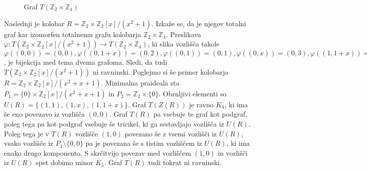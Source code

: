 \documentclass[a4paper, 12pt]{amsart}
\theoremstyle{definition} %
\theoremstyle{plain} %
\newcommand{\Z}{\mathbb Z}
\begin{document}
\begin{enumerate}
\begin{figure}[h!]
\centering

\caption{Graf $T(\Z_2\times \Z_4)$}
\label{T(Z2xZ4)}
\end{figure}

Naslednji je kolobar $R=\Z_2 \times \Z_2[x]/(x^2 + 1)$. Izkaže se, da je njegov totalni graf kar izomorfen totalnemu grafu kolobarja $\Z_2 \times \Z_4$. Preslikava $\varphi : T(\Z_2 \times \Z_2[x]/(x^2 + 1)) \rightarrow T(\Z_2 \times \Z_4)$, ki slika vozlišča takole $\varphi((0,0))=(0,0),\varphi((0,1+x))=(0,2),\varphi((0,1))=(0,1),\varphi((0,x))=(0,3),\varphi((1,1+x))=(1,2),\varphi((1,0))=(1,0),\varphi((1,x))=(1,3),\varphi((1,1))=(1,1)$, je bijekcija med tema dvema grafoma. Sledi, da tudi $T(\Z_2 \times \Z_2[x]/(x^2 + 1))$ ni ravninski. Poglejmo si še primer kolobarja $R=\Z_2 \times \Z_2[x]/(x^2 + x+1)$. Minimalna praideala sta $P_1 = \{0\} \times \Z_2[x]/(x^2 + x+1)$ in $P_2 = \Z_2 \times \{0\}$. Obrnljivi elementi so $U(R) = \{(1,1), (1,x),(1,1+x)\}$. Graf $T(Z(R))$ je ravno $K_4$, ki ima še eno povezavo iz vozlišča $(0,0)$. Graf $T(R)$ pa vsebuje te graf kot podgraf, poleg tega pa kot podgraf vsebuje še tricikel, ki ga sestavljajo vozlišča iz $U(R)$. Poleg tega je v $T(R)$ vozlišče $(1,0)$ povezano še z vsemi vozlišči iz $U(R)$, vsako vozlišče iz $P_1\setminus \{0,0\}$ pa je povezana še s tistim vozliščem iz $U(R)$, ki ima enako drugo komponento. S skrčitvijo povezav med vozliščem $(1,0)$ in vozlišči iz $U(R)$ spet dobimo minor $K_5$. Graf $T(R)$ tudi tokrat ni ravninski. 


\end{enumerate}
\end{document}
